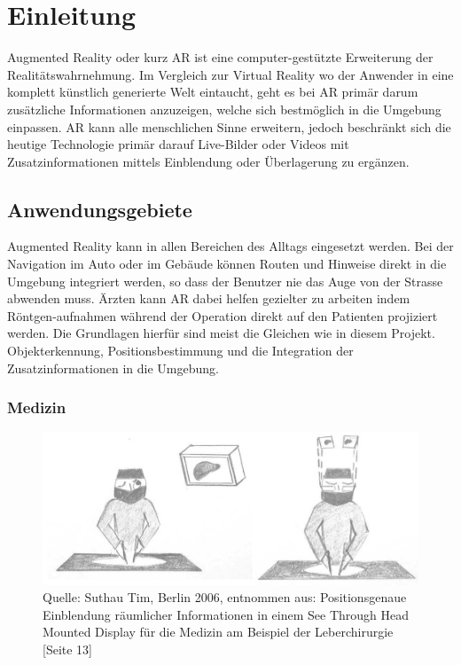 \chapter{Einleitung}

Augmented Reality oder kurz AR ist eine computer-gestützte Erweiterung der Realitätswahrnehmung. Im Vergleich zur Virtual Reality wo der Anwender in eine komplett künstlich generierte Welt eintaucht, geht es bei AR primär darum zusätzliche Informationen anzuzeigen, welche sich bestmöglich in die Umgebung einpassen. AR kann alle menschlichen Sinne erweitern, jedoch beschränkt sich die heutige Technologie primär darauf Live-Bilder oder Videos mit Zusatzinformationen mittels Einblendung oder Überlagerung zu ergänzen.

\section{Anwendungsgebiete}

Augmented Reality kann in allen Bereichen des Alltags eingesetzt werden. Bei der Navigation im Auto oder im Gebäude können Routen und Hinweise direkt in die Umgebung integriert werden, so dass der Benutzer nie das Auge von der Strasse abwenden muss. Ärzten kann AR dabei helfen gezielter zu arbeiten indem Röntgen-aufnahmen während der Operation direkt auf den Patienten projiziert werden. Die Grundlagen hierfür sind meist die Gleichen wie in diesem Projekt. Objekterkennung, Positionsbestimmung und die Integration der Zusatzinformationen in die Umgebung.

\subsection{Medizin}

\begin{figure}[!ht]
\centering
\includegraphics[scale=0.3]{images/vorteile_augmented_reality_medizin} 
\caption{Quelle: Suthau Tim, Berlin 2006, entnommen aus: Positionsgenaue Einblendung räumlicher Informationen in einem See Through Head Mounted Display für die Medizin am Beispiel der Leberchirurgie [Seite 13]}
\label{fig:ar-medicine}
\end{figure}

